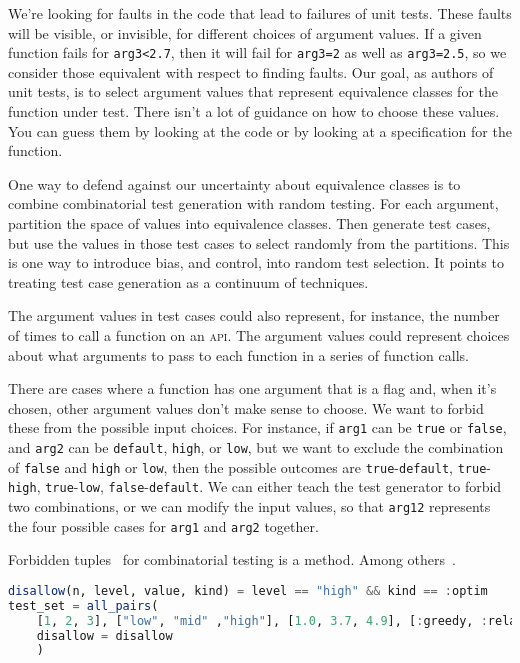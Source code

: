 \documentclass{juliacon}
\begin{document}
\vskip 6pt
We're looking for faults in the code that lead to failures of unit tests. These faults will be visible, or invisible, for different choices of argument values. If a given function fails for \verb|arg3<2.7|, then it will fail for \verb|arg3=2| as well as \verb|arg3=2.5|, so we consider those equivalent with respect to finding faults. Our goal, as authors of unit tests, is to select argument values that represent equivalence classes for the function under test. There isn't a lot of guidance on how to choose these values. You can guess them by looking at the code or by looking at a specification for the function.

\vskip 6pt
One way to defend against our uncertainty about equivalence classes is to combine combinatorial test generation with random testing. For each argument, partition the space of values into equivalence classes. Then generate test cases, but use the values in those test cases to select randomly from the partitions. This is one way to introduce bias, and control, into random test selection. It points to treating test case generation as a continuum of techniques.

\vskip 6pt
The argument values in test cases could also represent, for instance, the number of times to call a function on an \textsc{api}. The argument values could represent choices about what arguments to pass to each function in a series of function calls.

\vskip 6pt
There are cases where a function has one argument that is a flag and, when it's chosen, other argument values don't make sense to choose. We want to forbid these from the possible input choices. For instance, if \verb|arg1| can be \verb|true| or \verb|false|, and \verb|arg2| can be \verb|default|, \verb|high|, or \verb|low|, but we want to exclude the combination of \verb|false| and \verb|high| or \verb|low|, then the possible outcomes are \verb|true|-\verb|default|, \verb|true|-\verb|high|, \verb|true|-\verb|low|, \verb|false|-\verb|default|. We can either teach the test generator to forbid two combinations, or we can modify the input values, so that \verb|arg12| represents the four possible cases for \verb|arg1| and \verb|arg2| together.

\vskip 6pt
Forbidden tuples~\cite{Petke2015-ex} for combinatorial testing is a method. Among others~\cite{Grindal2006-vy}.
\begin{lstlisting}[language=Julia]
disallow(n, level, value, kind) = level == "high" && kind == :optim
test_set = all_pairs(
    [1, 2, 3], ["low", "mid" ,"high"], [1.0, 3.7, 4.9], [:greedy, :relax, :optim];
    disallow = disallow
    )
\end{lstlisting}
\end{document}
